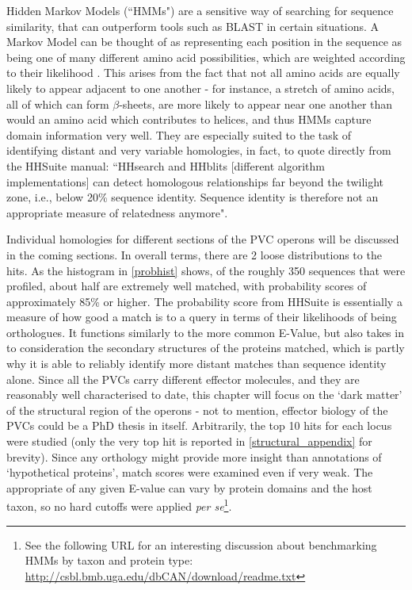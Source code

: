 Hidden Markov Models (``HMMs") are a sensitive way of searching for sequence similarity, that can outperform tools such as BLAST in certain situations. A Markov Model can be thought of as representing each position in the sequence as being one of many different amino acid possibilities, which are weighted according to their likelihood \citep{Eddy2004}. This arises from the fact that not all amino acids are equally likely to appear adjacent to one another - for instance, a stretch of amino acids, all of which can form $\beta$-sheets, are more likely to appear near one another than would an amino acid which contributes to helices, and thus HMMs capture domain information very well. They are especially suited to the task of identifying distant and very variable homologies, in fact, to quote directly from the HHSuite manual: ``HHsearch and HHblits [different algorithm implementations] can detect homologous relationships far beyond the twilight zone, i.e., below 20\% sequence identity. Sequence identity is therefore not an appropriate measure of relatedness anymore".

Individual homologies for different sections of the PVC operons will be discussed in the coming sections. In overall terms, there are 2 loose distributions to the hits. As the histogram in \vref{probhist} shows, of the roughly 350 sequences that were profiled, about half are extremely well matched, with probability scores of approximately 85\% or higher. The probability score from HHSuite is essentially a measure of how good a match is to a query in terms of their likelihoods of being orthologues. It functions similarly to the more common E-Value, but also takes in to consideration the secondary structures of the proteins matched, which is partly why it is able to reliably identify more distant matches than sequence identity alone. Since all the PVCs carry different effector molecules, and they are reasonably well characterised to date, this chapter will focus on the `dark matter' of the structural region of the operons - not to mention, effector biology of the PVCs could be a PhD thesis in itself. Arbitrarily, the top 10 hits for each locus were studied (only the very top hit is reported in \vref{structural_appendix} for brevity). Since any orthology might provide more insight than annotations of `hypothetical proteins', match scores were examined even if very weak. The appropriate of any given E-value can vary by protein domains and the host taxon, so no hard cutoffs were applied \emph{per se}\footnote{See the following URL for an interesting discussion about benchmarking HMMs by taxon and protein type: \url{http://csbl.bmb.uga.edu/dbCAN/download/readme.txt}}.

